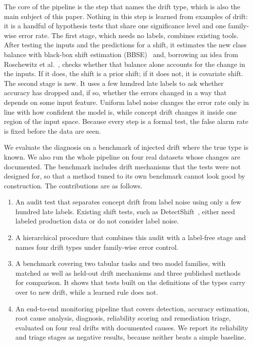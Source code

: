 \documentclass[pdflatex,referee,lineno,sn-basic]{sn-jnl}
\begin{document}
The core of the pipeline is the step that names the drift type, which is also the main subject of this paper. Nothing in this step is learned from examples of drift: it is a handful of hypothesis tests that share one significance level and one family-wise error rate. The first stage, which needs no labels, combines existing tools. After testing the inputs and the predictions for a shift, it estimates the new class balance with black-box shift estimation (BBSE)~\citep{lipton2018bbse} and, borrowing an idea from Roschewitz et al.~\citeyearpar{roschewitz2025shiftid}, checks whether that balance alone accounts for the change in the inputs. If it does, the shift is a prior shift; if it does not, it is covariate shift. The second stage is new. It uses a few hundred late labels to ask whether accuracy has dropped and, if so, whether the errors changed in a way that depends on some input feature. Uniform label noise changes the error rate only in line with how confident the model is, while concept drift changes it inside one region of the input space. Because every step is a formal test, the false alarm rate is fixed before the data are seen.

We evaluate the diagnosis on a benchmark of injected drift where the true type is known. We also run the whole pipeline on four real datasets whose changes are documented. The benchmark includes drift mechanisms that the tests were not designed for, so that a method tuned to its own benchmark cannot look good by construction. The contributions are as follows.

\begin{enumerate}
\item An audit test that separates concept drift from label noise using only a few hundred late labels. Existing shift tests, such as DetectShift~\citep{maiapolo2023detectshift}, either need labeled production data or do not consider label noise.
\item A hierarchical procedure that combines this audit with a label-free stage and names four drift types under family-wise error control.
\item A benchmark covering two tabular tasks and two model families, with matched as well as held-out drift mechanisms and three published methods for comparison. It shows that tests built on the definitions of the types carry over to new drift, while a learned rule does not.
\item An end-to-end monitoring pipeline that covers detection, accuracy estimation, root cause analysis, diagnosis, reliability scoring and remediation triage, evaluated on four real drifts with documented causes. We report its reliability and triage stages as negative results, because neither beats a simple baseline.
\end{enumerate}
\end{document}
